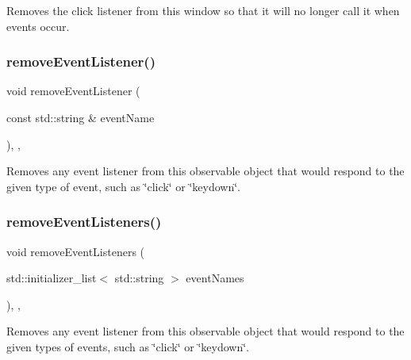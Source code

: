 Removes the click listener from this window so that it will no longer call it when events occur. 

\mbox{\label{classsgl_1_1GObservable_acbcf1ed3a851ad8a3c17ef38d86b481d}} 
\subsubsection{\texorpdfstring{remove\+Event\+Listener()}{removeEventListener()}}
{\footnotesize\ttfamily void remove\+Event\+Listener (\begin{DoxyParamCaption}\item[{const std\+::string \&}]{event\+Name }\end{DoxyParamCaption})\hspace{0.3cm}{\ttfamily [protected]}, {\ttfamily [virtual]}, {\ttfamily [inherited]}}



Removes any event listener from this observable object that would respond to the given type of event, such as \char`\"{}click\char`\"{} or \char`\"{}keydown\char`\"{}. 

\mbox{\label{classsgl_1_1GObservable_af51cc35c29a1bd1908609d432decdbb6}} 
\subsubsection{\texorpdfstring{remove\+Event\+Listeners()}{removeEventListeners()}}
{\footnotesize\ttfamily void remove\+Event\+Listeners (\begin{DoxyParamCaption}\item[{std\+::initializer\+\_\+list$<$ std\+::string $>$}]{event\+Names }\end{DoxyParamCaption})\hspace{0.3cm}{\ttfamily [protected]}, {\ttfamily [virtual]}, {\ttfamily [inherited]}}



Removes any event listener from this observable object that would respond to the given types of events, such as \char`\"{}click\char`\"{} or \char`\"{}keydown\char`\"{}. 

